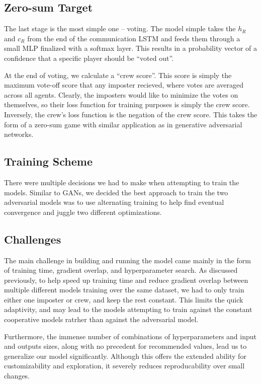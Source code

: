 \documentclass[10pt,twocolumn,letterpaper]{article}
\begin{document}
\subsection{Zero-sum Target}
The last stage is the most simple one -- voting. The model simple takes the $h_R$ and
$c_R$ from the end of the communication LSTM and feeds them through
a small MLP finalized with a softmax layer. This results in a probability vector
of a confidence that a specific player should be ``voted out''.

At the end of voting, we calculate a ``crew score''. This score is simply the
maximum vote-off score that any imposter recieved, where votes
are averaged across all agents. Clearly, the imposters would like to minimize the
votes on themselves, so their loss function for training purposes is
simply the crew score. Inversely, the crew's loss function is the negation of
the crew score. This takes the form of a zero-sum game with similar application
as in generative adversarial networks.
\subsection{Training Scheme}
There were multiple decisions we had to make when attempting to train the models.
Similar to GANs, we decided the best approach to train the two adversarial models was to
use alternating training to help find eventual convergence and juggle two different
optimizations.

\subsection{Challenges}
The main challenge in building and running the model
came mainly in the form of training time, gradient overlap, 
and hyperparameter search. As discussed previously, to help speed up training time
and reduce gradient overlap between multiple different models training over the
same dataset, we had to only train either one imposter or crew, and keep the rest constant.
This limits the quick adaptivity, and may lead to the models attempting to train
against the constant cooperative models ratrher than against the adversarial model.

Furthermore, the immense number of combinations of hyperparameters
and input and outputs sizes, along with no precedent for recommended values,
lead us to generalize our model significantly. Although this offers the extended ability for
customizability and exploration, it severely reduces reproducability over small changes. 
\end{document}
